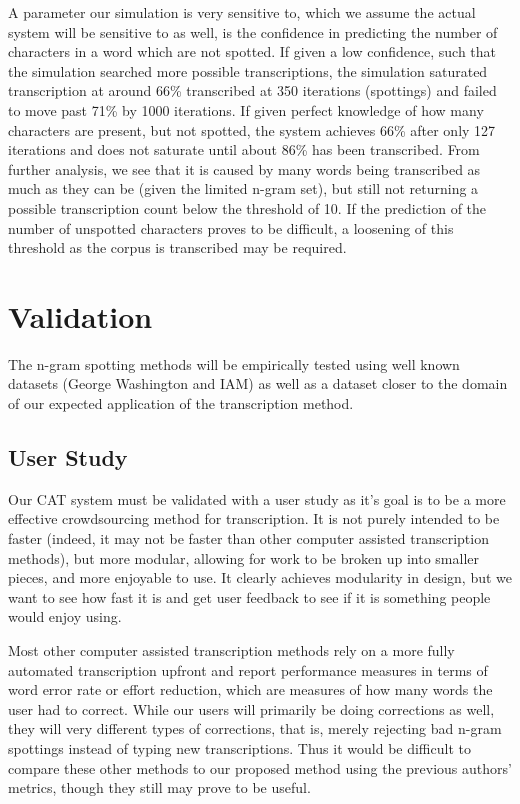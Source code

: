 \documentclass[ms]{byuprop}
\begin{document}
A parameter our simulation is very sensitive to, which we assume the actual system will be sensitive to as well, is the confidence in predicting the number of characters in a word which are not spotted. If given a low confidence, such that the simulation searched more possible transcriptions, the simulation saturated transcription at around 66\% transcribed at 350 iterations (spottings) and failed to move past 71\% by 1000 iterations. If given perfect knowledge of how many characters are present, but not spotted, the system achieves 66\% after only 127 iterations and does not saturate until about 86\% has been transcribed. From further analysis, we see that it is caused by many words being transcribed as much as they can be (given the limited n-gram set), but still not returning a possible transcription count below the threshold of 10. If the prediction of the number of unspotted characters proves to be difficult, a loosening of this threshold as the corpus is transcribed may be required.



\section{Validation}
The n-gram spotting methods will be empirically tested using well known datasets (George Washington\cite{GW} and IAM\cite{IAM}) as well as a dataset closer to the domain of our expected application of the transcription method.

\subsection{User Study}

Our CAT system must be validated with a user study as it's goal is to be a more effective crowdsourcing method for transcription. It is not purely intended to be faster (indeed, it may not be faster than other computer assisted transcription methods), but more modular, allowing for work to be broken up into smaller pieces, and more enjoyable to use. It clearly achieves modularity in design, but we want to see how fast it is and get user feedback to see if it is something people would enjoy using.

Most other computer assisted transcription methods rely on a more fully automated transcription upfront and report performance measures in terms of word error rate or effort reduction, which are measures of how many words the user had to correct. While our users will primarily be doing corrections as well, they will very different types of corrections, that is, merely rejecting bad n-gram spottings instead of typing new transcriptions. Thus it would be difficult to compare these other methods to our proposed method using the previous authors' metrics, though they still may prove to be useful.
\end{document}
